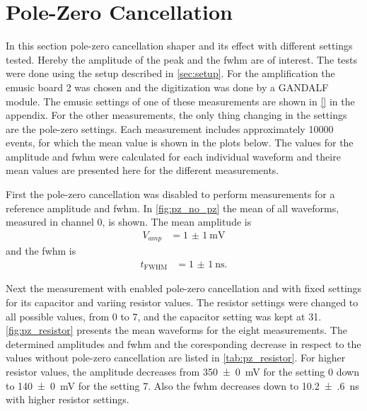 \section{Pole-Zero Cancellation}

In this section pole-zero cancellation shaper and its effect with different settings tested.
Hereby the amplitude of the peak and the \ac{fwhm} are of interest.
The tests were done using the setup described in \autoref{sec:setup}.
For the amplification the \ac{emusic} board 2 was chosen and the digitization was done by a GANDALF module.
The \ac{emusic} settings of one of these measurements are shown in \autoref{} in the appendix.
For the other measurements, the only thing changing in the settings are the pole-zero settings.
Each measurement includes approximately \num{10000} events, for which the mean value is shown in the plots below.
The values for the amplitude and \ac{fwhm} were calculated for each individual waveform and theire mean values are presented here for the different measurements.

First the pole-zero cancellation was disabled to perform measurements for a reference amplitude and \ac{fwhm}.
In \autoref{fig:pz_no_pz} the mean of all waveforms, measured in channel 0, is shown.
The mean amplitude is 
\begin{align}
    V_{amp} &= \SI{1(1)}{\milli\volt}
\end{align}
and the \ac{fwhm} is
\begin{align}
    t_\text{FWHM} &= \SI{1(1)}{\nano\second}.
\end{align}

Next the measurement with enabled pole-zero cancellation and with fixed settings for its capacitor and variing resistor values.
The resistor settings were changed to all possible values, from 0 to 7, and the capacitor setting was kept at 31.
\autoref{fig:pz_resistor} presents the mean waveforms for the eight measurements.
The determined amplitudes and \ac{fwhm} and the coresponding decrease in respect to the values without pole-zero cancellation are listed in \autoref{tab:pz_resistor}.
For higher resistor values, the amplitude decreases from \SI{350(0)}{\milli\volt} for the setting 0 down to \SI{140(0)}{\milli\volt} for the setting 7.
Also the \ac{fwhm} decreases down to \SI{10.2(6)}{\nano\second} with higher resistor settings.



